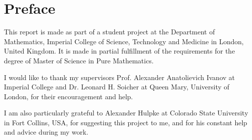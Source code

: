 \chapter*{Preface}

This report is made as part of a student project at the Department of
Mathematics, Imperial College of Science, Technology and Medicine in
London, United Kingdom. It is made in partial fulfillment of the
requirements for the degree of Master of Science in Pure Mathematics.

I would like to thank my supervisors Prof. Alexander Anatolievich
Ivanov at Imperial College and Dr. Leonard H. Soicher at Queen Mary,
University of London, for their encouragement and help.

I am also particularly grateful to Alexander Hulpke at Colorado
State University in Fort Collins, USA, for suggesting this project to
me, and for his constant help and advice during my work.
